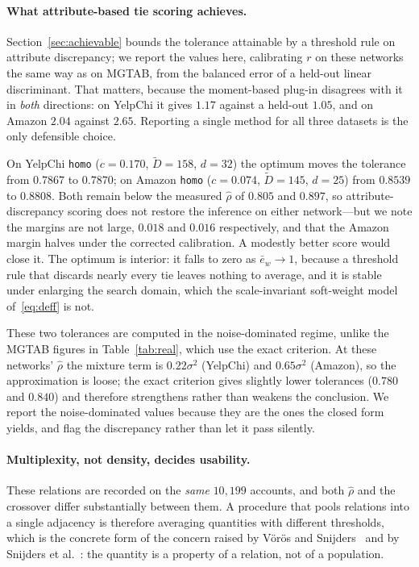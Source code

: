 \documentclass[../elsevier.tex]{subfiles}
\begin{document}
\paragraph{What attribute-based tie scoring achieves.}
Section~\ref{sec:achievable} bounds the tolerance attainable by a threshold rule on
attribute discrepancy; we report the values here, calibrating $r$ on these networks the
same way as on MGTAB, from the balanced error of a held-out linear discriminant. That
matters, because the moment-based plug-in disagrees with it in \emph{both} directions:
on YelpChi it gives $1.17$ against a held-out $1.05$, and on Amazon $2.04$ against
$2.65$. Reporting a single method for all three datasets is the only defensible choice.

On YelpChi \texttt{homo} ($c=0.170$, $\tilde D=158$, $d=32$) the optimum moves the
tolerance from $0.7867$ to $0.7870$; on Amazon \texttt{homo} ($c=0.074$, $\tilde D=145$,
$d=25$) from $0.8539$ to $0.8808$. Both remain below the measured $\hat\rho$ of $0.805$
and $0.897$, so attribute-discrepancy scoring does not restore the inference on either
network---but we note the margins are not large, $0.018$ and $0.016$ respectively, and
that the Amazon margin halves under the corrected calibration. A modestly better score
would close it. The optimum is interior: it falls to zero as $\bar e_w \to 1$, because a
threshold rule that discards nearly every tie leaves nothing to average, and it is
stable under enlarging the search domain, which the scale-invariant soft-weight model
of~\eqref{eq:deff} is not.

These two tolerances are computed in the noise-dominated regime, unlike the MGTAB
figures in Table~\ref{tab:real}, which use the exact criterion. At these networks'
$\hat\rho$ the mixture term is $0.22\sigma^2$ (YelpChi) and $0.65\sigma^2$ (Amazon), so
the approximation is loose; the exact criterion gives slightly lower tolerances
($0.780$ and $0.840$) and therefore strengthens rather than weakens the conclusion. We
report the noise-dominated values because they are the ones the closed form yields, and
flag the discrepancy rather than let it pass silently.

\paragraph{Multiplexity, not density, decides usability.} These relations are recorded
on the \emph{same} $10{,}199$ accounts, and both $\hat\rho$ and the crossover differ
substantially between them. A procedure that pools relations into a single adjacency
is therefore averaging quantities with different thresholds, which is the concrete
form of the concern raised by V\"or\"os and Snijders~\citeyearpar{voros2017cluster} and by
Snijders et al.~\citeyearpar{snijders2013model}: the quantity is a property of a relation,
not of a population.
\end{document}
